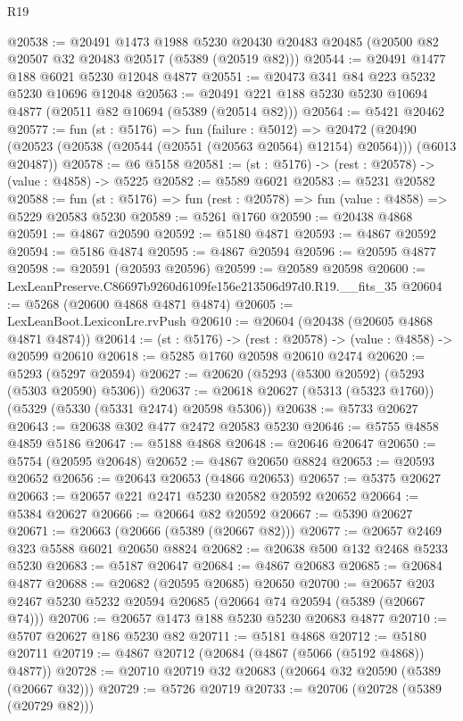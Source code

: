 \begin{lexlean}{R19}
\begin{coremodule}
@20538 := @20491
    @1473
    @1988
    @5230
    @20430
    @20483
    @20485
    (@20500 @82 @20507 @32 @20483 @20517 (@5389 (@20519 @82)))
@20544 := @20491 @1477 @188 @6021 @5230 @12048 @4877
@20551 := @20473 @341 @84 @223 @5232 @5230 @10696 @12048
@20563 := @20491 @221 @188 @5230 @5230 @10694 @4877 (@20511 @82 @10694 (@5389 (@20514 @82)))
@20564 := @5421 @20462
@20577 := fun (st : @5176) =>
  fun (failure : @5012) =>
  @20472 (@20490 (@20523 (@20538 (@20544 (@20551 (@20563 @20564) @12154) @20564))) (@6013 @20487))
@20578 := @6 @5158
@20581 := (st : @5176) -> (rest : @20578) -> (value : @4858) -> @5225
@20582 := @5589 @6021
@20583 := @5231 @20582
@20588 := fun (st : @5176) => fun (rest : @20578) => fun (value : @4858) => @5229 @20583 @5230
@20589 := @5261 @1760
@20590 := @20438 @4868
@20591 := @4867 @20590
@20592 := @5180 @4871
@20593 := @4867 @20592
@20594 := @5186 @4874
@20595 := @4867 @20594
@20596 := @20595 @4877
@20598 := @20591 (@20593 @20596)
@20599 := @20589 @20598
@20600 := LexLeanPreserve.C86697b9260d6109fe156e213506d97d0.R19.__fits_35
@20604 := @5268 (@20600 @4868 @4871 @4874)
@20605 := LexLeanBoot.LexiconLre.rvPush
@20610 := @20604 (@20438 (@20605 @4868 @4871 @4874))
@20614 := (st : @5176) -> (rest : @20578) -> (value : @4858) -> @20599 @20610
@20618 := @5285 @1760 @20598 @20610 @2474
@20620 := @5293 (@5297 @20594)
@20627 := @20620 (@5293 (@5300 @20592) (@5293 (@5303 @20590) @5306))
@20637 := @20618 @20627 (@5313 (@5323 @1760)) (@5329 (@5330 (@5331 @2474) @20598 @5306))
@20638 := @5733 @20627
@20643 := @20638 @302 @477 @2472 @20583 @5230
@20646 := @5755 @4858 @4859 @5186
@20647 := @5188 @4868
@20648 := @20646 @20647
@20650 := @5754 (@20595 @20648)
@20652 := @4867 @20650 @8824
@20653 := @20593 @20652
@20656 := @20643 @20653 (@4866 @20653)
@20657 := @5375 @20627
@20663 := @20657 @221 @2471 @5230 @20582 @20592 @20652
@20664 := @5384 @20627
@20666 := @20664 @82 @20592
@20667 := @5390 @20627
@20671 := @20663 (@20666 (@5389 (@20667 @82)))
@20677 := @20657 @2469 @323 @5588 @6021 @20650 @8824
@20682 := @20638 @500 @132 @2468 @5233 @5230
@20683 := @5187 @20647
@20684 := @4867 @20683
@20685 := @20684 @4877
@20688 := @20682 (@20595 @20685) @20650
@20700 := @20657 @203 @2467 @5230 @5232 @20594 @20685 (@20664 @74 @20594 (@5389 (@20667 @74)))
@20706 := @20657 @1473 @188 @5230 @5230 @20683 @4877
@20710 := @5707 @20627 @186 @5230 @82
@20711 := @5181 @4868
@20712 := @5180 @20711
@20719 := @4867 @20712 (@20684 (@4867 (@5066 (@5192 @4868)) @4877))
@20728 := @20710 @20719 @32 @20683 (@20664 @32 @20590 (@5389 (@20667 @32)))
@20729 := @5726 @20719
@20733 := @20706 (@20728 (@5389 (@20729 @82)))

\end{coremodule}
\end{lexlean}
